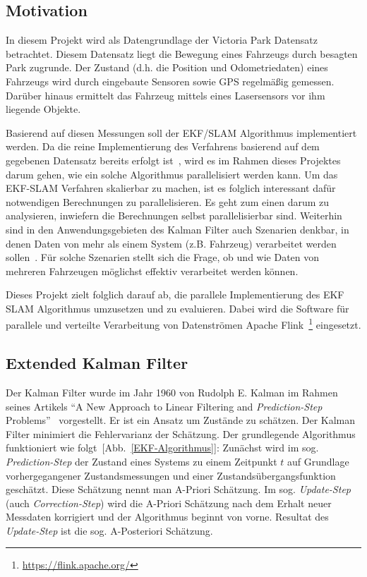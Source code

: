 \documentclass[11pt]{article}
\begin{document}
\subsection{Motivation}
In diesem Projekt wird als Datengrundlage der Victoria Park Datensatz betrachtet. Diesem Datensatz liegt die Bewegung eines Fahrzeugs durch besagten Park zugrunde. Der Zustand (d.h. die Position und Odometriedaten) eines Fahrzeugs wird durch eingebaute Sensoren sowie GPS regelmäßig gemessen. Darüber hinaus ermittelt das Fahrzeug mittels eines Lasersensors vor ihm liegende Objekte.

Basierend auf diesen Messungen soll der EKF/SLAM Algorithmus implementiert werden. Da die reine Implementierung des Verfahrens basierend auf dem gegebenen Datensatz bereits erfolgt ist~\cite{ute_SLAM}, wird es im Rahmen dieses Projektes darum gehen, wie ein solche Algorithmus parallelisiert werden kann. Um das EKF-SLAM Verfahren skalierbar zu machen, ist es folglich interessant dafür notwendigen Berechnungen zu parallelisieren. Es geht zum einen darum zu analysieren, inwiefern die Berechnungen selbst parallelisierbar sind. Weiterhin sind in den Anwendungsgebieten des Kalman Filter auch Szenarien denkbar, in denen Daten von mehr als einem System (z.B. Fahrzeug) verarbeitet werden sollen~\cite{vessel}. Für solche Szenarien stellt sich die Frage, ob  und wie Daten von mehreren Fahrzeugen möglichst effektiv verarbeitet werden können.

Dieses Projekt zielt folglich darauf ab, die parallele Implementierung des EKF SLAM Algorithmus umzusetzen und zu evaluieren. Dabei wird die Software für parallele und verteilte Verarbeitung von Datenströmen Apache Flink~\footnote{\url{https://flink.apache.org/}} eingesetzt.

\subsection{Extended Kalman Filter}
Der Kalman Filter wurde im Jahr 1960 von Rudolph E. Kalman im Rahmen seines Artikels “A New Approach to Linear Filtering and \textit{Prediction-Step} Problems”~\cite{kalman1960new} vorgestellt. Er ist ein Ansatz um Zustände zu schätzen. Der Kalman Filter minimiert die Fehlervarianz der Schätzung. Der grundlegende Algorithmus funktioniert wie folgt~[Abb.~\ref{EKF-Algorithmus}]: Zunächst wird im sog. \textit{Prediction-Step} der Zustand eines Systems zu einem Zeitpunkt $t$ auf Grundlage vorhergegangener Zustands\-messungen und einer Zustands\-übergangs\-funktion geschätzt. Diese Schätzung nennt man A-Priori Schätzung. Im sog. \textit{Update-Step} (auch \textit{Correction-Step}) wird die A-Priori Schätzung nach dem Erhalt neuer Messdaten korrigiert und der Algorithmus beginnt von vorne. Resultat des \textit{Update-Step} ist die sog. A-Posteriori Schätzung.
\end{document}
